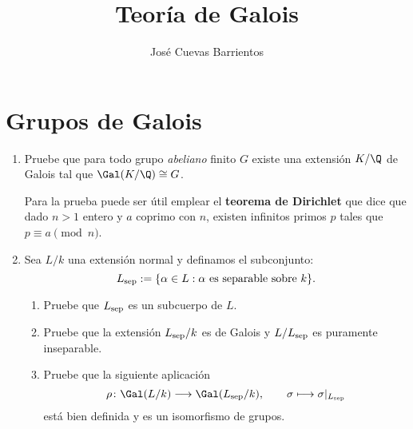 \documentclass[11pt, reqno]{amsart}
\title{Teoría de Galois}
\date{\DTMdate{2025-08-20}}
\author{José Cuevas Barrientos}
\begin{document}
\maketitle

\section{Grupos de Galois}
\begin{enumerate}

	\item\label{exr:inverse_gal_ab}\lookst
		Pruebe que para todo grupo \emph{abeliano} finito $G$ existe una extensión $K/\Q$ de Galois tal que
		$\Gal(K/\Q) \cong G$.

		\begin{hint}
			Para la prueba puede ser útil emplear el \textbf{teorema de Dirichlet} que dice que
			dado $n > 1$ entero y $a$ coprimo con $n$, existen infinitos primos $p$ tales que $p \equiv a
			\pmod n$.
		\end{hint}

	\item Sea $L/k$ una extensión normal y definamos el subconjunto:
		\[
			L_{\rm sep} := \{ \alpha \in L : \alpha \text{ es separable sobre } k \}.
		\]
		\begin{enumerate}
			\item Pruebe que $L_{\rm sep}$ es un subcuerpo de $L$.
			\item Pruebe que la extensión $L_{\rm sep}/k$ es de Galois y $L/L_{\rm sep}$ es puramente inseparable.
			\item Pruebe que la siguiente aplicación
				\[
					\rho \colon \Gal(L/k) \longrightarrow \Gal(L_{\rm sep}/k), \qquad \sigma \longmapsto \sigma|_{L_{\rm sep}}
				\]
				está bien definida y es un isomorfismo de grupos.
		\end{enumerate}


\end{enumerate}
\end{document}
